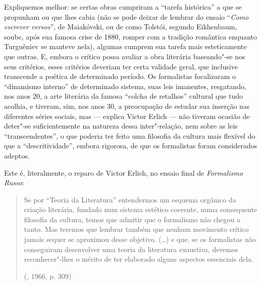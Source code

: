 {Expliquemos melhor: se certas obras cumpriram a
``tarefa histórica'' a que se propunham ou que lhes cabia (não se pode deixar de lembrar do ensaio ``\emph{Como escrever versos}'', de
Maiakóvski, ou de como Tolstói, segundo Eikhenbaum, soube, após sua
famosa crise de 1880, romper com a tradição romântica enquanto
Turguêniev se manteve nela), algumas cumprem sua tarefa mais
esteticamente que outras. E, embora o crítico possa avaliar a obra
literária baseando"-se nos seus critérios, esses critérios deveriam ter
certa validade geral, que inclusive transcende a poética de determinado
período. Os formalistas focalizaram o ``dinamismo interno'' de determinado sistema, suas leis imanentes, resgatando, nos anos 20, a
arte literária da famosa ``colcha de retalhos'' cultural que tudo
acolhia, e tiveram, sim, nos anos 30, a preocupação de estudar sua
inserção nas diferentes séries sociais, mas --- explica Victor Erlich ---
não tiveram ocasião de deter"-se suficientemente na natureza dessa
inter"-relação, nem sobre as leis ``transcendentes'', o que poderia
ter feito uma filosofia da cultura mais flexível do que a
``descritividade'', embora rigorosa, de que os formalistas foram considerados
adeptos.

Este é, literalmente, o reparo de Victor Erlich, no ensaio final de
\emph{Formalismo Russo}:

\begin{quote}
Se por ``Teoria da Literatura'' entendermos um esquema orgânico da
criação literária, fundado num sistema estético coerente, numa
consequente filosofia da cultura, temos que admitir que o formalismo não
chegou a tanto. Mas teremos que lembrar também que nenhum movimento
crítico jamais sequer se aproximou desse objetivo. (\ldots{}) e que, se os
formalistas não conseguiram desenvolver uma teoria da literatura
exaustiva, devemos reconhecer"-lhes o mérito de ter elaborado alguns
aspectos essenciais dela. 

(, 1966, p. 309)
\end{quote}

}
